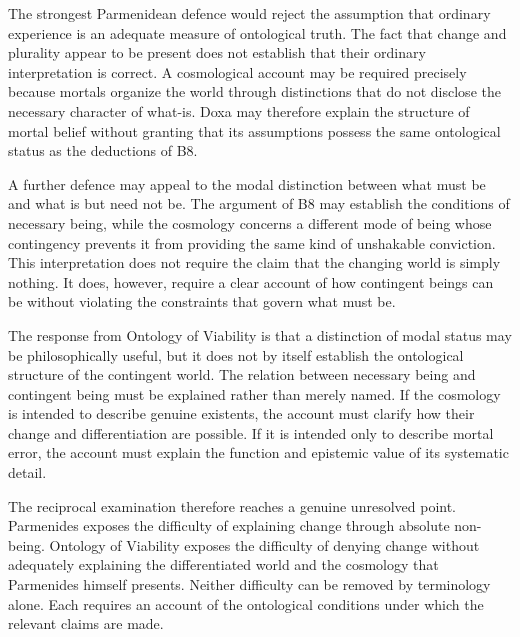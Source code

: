 The strongest Parmenidean defence
would reject the assumption that
ordinary experience is an adequate
measure of ontological truth. The
fact that change and plurality appear
to be present does not establish
that their ordinary interpretation
is correct. A cosmological account
may be required precisely because
mortals organize the world through
distinctions that do not disclose
the necessary character of what-is.
Doxa may therefore explain the
structure of mortal belief without
granting that its assumptions
possess the same ontological
status as the deductions of B8.


A further defence may appeal to the
modal distinction between what must
be and what is but need not be.
The argument of B8 may establish
the conditions of necessary being,
while the cosmology concerns a
different mode of being whose
contingency prevents it from
providing the same kind of
unshakable conviction. This
interpretation does not require
the claim that the changing world
is simply nothing. It does,
however, require a clear account
of how contingent beings can be
without violating the constraints
that govern what must be.


The response from Ontology of Viability
is that a distinction of modal status
may be philosophically useful, but
it does not by itself establish the
ontological structure of the contingent
world. The relation between necessary
being and contingent being must be
explained rather than merely named.
If the cosmology is intended to
describe genuine existents, the
account must clarify how their
change and differentiation are
possible. If it is intended only
to describe mortal error, the
account must explain the function
and epistemic value of its
systematic detail.


The reciprocal examination therefore
reaches a genuine unresolved point.
Parmenides exposes the difficulty
of explaining change through
absolute non-being. Ontology of
Viability exposes the difficulty
of denying change without
adequately explaining the
differentiated world and the
cosmology that Parmenides himself
presents. Neither difficulty
can be removed by terminology
alone. Each requires an account
of the ontological conditions
under which the relevant claims
are made.

